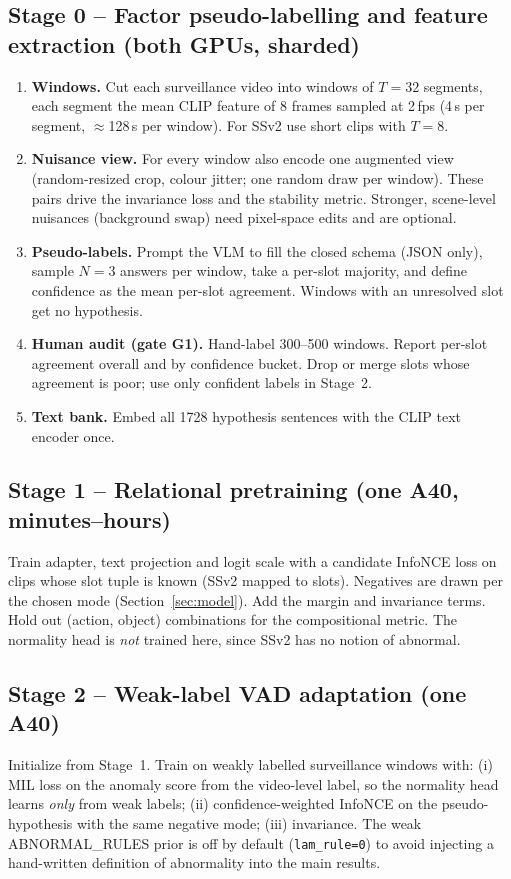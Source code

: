 \documentclass[11pt,a4paper]{article}
\newcommand{\code}[1]{\texttt{#1}}
\begin{document}
\subsection*{Stage 0 -- Factor pseudo-labelling and feature extraction (both GPUs, sharded)}
\begin{enumerate}
\item \textbf{Windows.} Cut each surveillance video into windows of $T{=}32$ segments, each segment the mean CLIP feature of 8 frames sampled at 2\,fps (4\,s per segment, $\approx$128\,s per window). For SSv2 use short clips with $T{=}8$.
\item \textbf{Nuisance view.} For every window also encode one augmented view (random-resized crop, colour jitter; one random draw per window). These pairs drive the invariance loss and the stability metric. Stronger, scene-level nuisances (background swap) need pixel-space edits and are optional.
\item \textbf{Pseudo-labels.} Prompt the VLM to fill the closed schema (JSON only), sample $N{=}3$ answers per window, take a per-slot majority, and define confidence as the mean per-slot agreement. Windows with an unresolved slot get no hypothesis.
\item \textbf{Human audit (gate G1).} Hand-label 300--500 windows. Report per-slot agreement overall and by confidence bucket. Drop or merge slots whose agreement is poor; use only confident labels in Stage~2.
\item \textbf{Text bank.} Embed all 1728 hypothesis sentences with the CLIP text encoder once.
\end{enumerate}

\subsection*{Stage 1 -- Relational pretraining (one A40, minutes--hours)}
Train adapter, text projection and logit scale with a candidate InfoNCE loss on clips whose slot tuple is known (SSv2 mapped to slots). Negatives are drawn per the chosen mode (Section~\ref{sec:model}). Add the margin and invariance terms. Hold out (action, object) combinations for the compositional metric. The normality head is \emph{not} trained here, since SSv2 has no notion of abnormal.

\subsection*{Stage 2 -- Weak-label VAD adaptation (one A40)}
Initialize from Stage~1. Train on weakly labelled surveillance windows with: (i) MIL loss on the anomaly score from the video-level label, so the normality head learns \emph{only} from weak labels; (ii) confidence-weighted InfoNCE on the pseudo-hypothesis with the same negative mode; (iii) invariance. The weak ABNORMAL\_RULES prior is off by default (\code{lam\_rule=0}) to avoid injecting a hand-written definition of abnormality into the main results.
\end{document}
